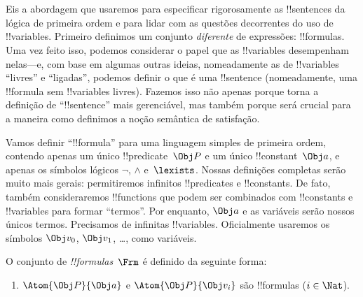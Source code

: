 \documentclass[../../../include/open-logic-section]{subfiles}
\begin{document}

\section{}

Eis a abordagem que usaremos para especificar rigorosamente as
!!{sentence}s da lógica de primeira ordem e para lidar com as questões
decorrentes do uso de !!{variable}s. Primeiro definimos um conjunto
\emph{diferente} de expressões: !!{formula}s. Uma vez feito isso,
podemos considerar o papel que as !!{variable}s desempenham nelas---e,
com base em algumas outras ideias, nomeadamente as de !!{variable}s
``livres'' e ``ligadas'', podemos definir o que é uma !!{sentence}
(nomeadamente, uma !!{formula} sem !!{variable}s livres). Fazemos
isso não apenas porque torna a definição de ``!!{sentence}'' mais
gerenciável, mas também porque será crucial para a maneira como
definimos a noção semântica de satisfação.

Vamos definir ``!!{formula}'' para uma linguagem simples de primeira
ordem, contendo apenas um único !!{predicate}~$\Obj P$ e um único
!!{constant}~$\Obj a$, e apenas os símbolos lógicos $\lnot$, $\land$
e~$\lexists$. Nossas definições completas serão muito mais gerais:
permitiremos infinitos !!{predicate}s e !!{constant}s. De
fato, também consideraremos !!{function}s que podem ser combinados com
!!{constant}s e !!{variable}s para formar ``termos''. Por enquanto,
$\Obj a$ e as variáveis serão nossos únicos termos.  Precisamos de
infinitas !!{variable}s.  Oficialmente usaremos os símbolos
$\Obj v_0$, $\Obj v_1$, \dots, como variáveis.

\begin{defn}
O conjunto de \emph{!!{formula}s}~$\Frm$ é definido da seguinte forma:
\begin{enumerate}
\item{} $\Atom{\Obj P}{\Obj a}$ e $\Atom{\Obj
  P}{\Obj v_i}$ são !!{formula}s ($i \in \Nat$).




\end{enumerate}
\end{defn}
\end{document}
